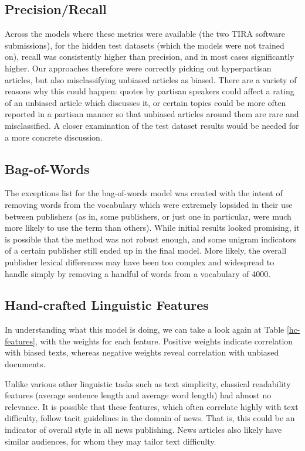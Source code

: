 \documentclass[11pt, a4paper]{article}
\begin{document}
\subsection{Precision/Recall}

Across the models where these metrics were available (the two TIRA software submissions), for the hidden test datasets (which the models were not trained on), recall was consistently higher than precision, and in most cases significantly higher. Our approaches therefore were correctly picking out hyperpartisan articles, but also misclassifying unbiased articles as biased. There are a variety of reasons why this could happen: quotes by partisan speakers could affect a rating of an unbiased article which discusses it, or certain topics could be more often reported in a partisan manner so that unbiased articles around them are rare and misclassified. A closer examination of the test dataset results would be needed for a more concrete discussion.

\subsection{Bag-of-Words}

The exceptions list for the bag-of-words model was created with the intent of removing words from the vocabulary which were extremely lopsided in their use between publishers (as in, some publishers, or just one in particular, were much more likely to use the term than others). While initial results looked promising, it is possible that the method was not robust enough, and some unigram indicators of a certain publisher still ended up in the final model. More likely, the overall publisher lexical differences may have been too complex and widespread to handle simply by removing a handful of words from a vocabulary of 4000.

\subsection{Hand-crafted Linguistic Features}

In understanding what this model is doing, we can take a look again at Table \ref{hc-features}, with the weights for each feature. Positive weights indicate correlation with biased texts, whereas negative weights reveal correlation with unbiased documents. 

Unlike various other linguistic tasks such as text simplicity, classical readability features (average sentence length and average word length) had almost no relevance. It is possible that these features, which often correlate highly with text difficulty, follow tacit guidelines in the domain of news. That is, this could be an indicator of overall style in all news publishing. News articles also likely have similar audiences, for whom they may tailor text difficulty.
\end{document}
